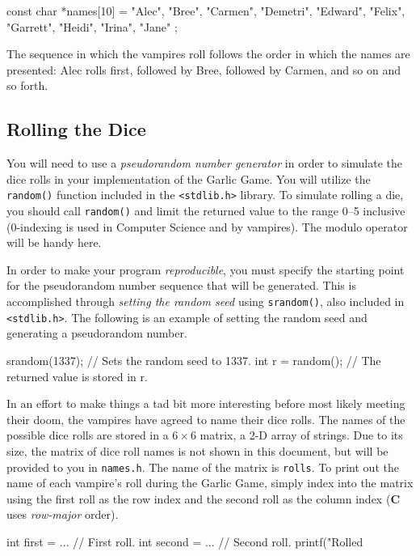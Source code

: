 \documentclass[11pt]{article}
\begin{document}
\begin{codelisting}{}
const char *names[10] = {
  "Alec",  "Bree",    "Carmen", "Demetri", "Edward",
  "Felix", "Garrett", "Heidi",  "Irina",   "Jane"
};
\end{codelisting}

The sequence in which the vampires roll follows the order in which the names are
presented: Alec rolls first, followed by Bree, followed by Carmen, and so on and
so forth.


\subsection{Rolling the Dice}

You will need to use a \emph{pseudorandom number generator} in order to simulate
the dice rolls in your implementation of the Garlic Game. You will utilize the
\texttt{random()} function included in the \texttt{<stdlib.h>} library. To
simulate rolling a die, you should call \texttt{random()} and limit the returned
value to the range 0--5 inclusive (0-indexing is used in Computer Science and by
vampires). The modulo operator will be handy here.

In order to make your program \emph{reproducible}, you must specify the starting
point for the pseudorandom number sequence that will be generated. This is
accomplished through \emph{setting the random seed} using \texttt{srandom()},
also included in \texttt{<stdlib.h>}. The following is an example of setting the
random seed and generating a pseudorandom number.

\begin{codelisting}{}
srandom(1337);    // Sets the random seed to 1337.
int r = random(); // The returned value is stored in r.
\end{codelisting}

In an effort to make things a tad bit more interesting before most likely
meeting their doom, the vampires have agreed to name their dice rolls.  The
names of the possible dice rolls are stored in a $6 \times 6$ matrix, a 2-D
array of strings. Due to its size, the matrix of dice roll names is not shown in
this document, but will be provided to you in \texttt{names.h}. The name of the
matrix is \texttt{rolls}. To print out the name of each vampire's roll during the
Garlic Game, simply index into the matrix using the first roll as the row index
and the second roll as the column index (\textbf{C} uses \emph{row-major}
order).

\begin{codelisting}{}
int first = ... // First roll.
int second = ... // Second roll.
printf("Rolled %
\end{codelisting}
\end{document}
